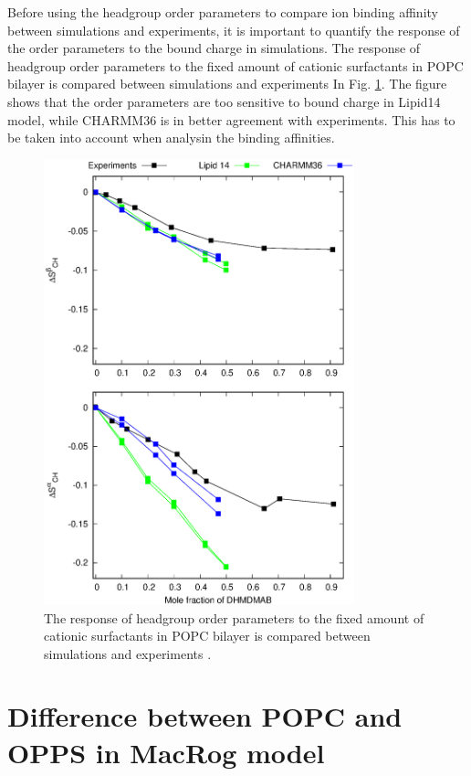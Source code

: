 \documentclass[aps,prl,superscriptaddress,twocolumn]{revtex4}
\begin{document}
Before using the headgroup order parameters to compare ion binding affinity between simulations
and experiments, it is important to quantify the response of the order parameters to the
bound charge in simulations.
The response of headgroup order parameters to the fixed amount of cationic surfactants in
POPC bilayer is compared between simulations and experiments \cite{scherer89} In Fig. \ref{CHANGESwithCaClPGPS}.
The figure shows that the order parameters are too sensitive to bound charge in Lipid14 model,
while CHARMM36 is in better agreement with experiments. This has to be taken into account when
analysin the binding affinities.
\begin{figure}[]
  \centering
  \includegraphics[width=9.0cm]{../Figs/HGopsDHMDMAB.eps}
  \caption{\label{CHANGESwithCaClPGPS}
  The response of headgroup order parameters to the fixed amount of cationic surfactants in
  POPC bilayer is compared between simulations and experiments \cite{scherer89}.}
\end{figure}

\section{Difference between POPC and OPPS in MacRog model}
\end{document}

